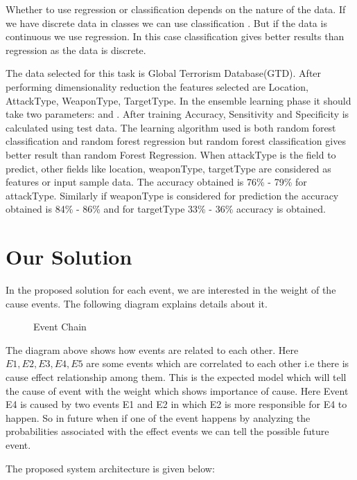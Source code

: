 \documentclass[journal,onecolumn,11pt]{IEEEtran}
\begin{document}
Whether to use regression or classification depends on the nature of the data. If we have discrete data in classes we can use classification . But if the data is continuous we use regression. In this case classification gives better results than regression as the data is discrete.

The data selected for this task is Global Terrorism Database(GTD). After performing dimensionality reduction the features selected are Location, AttackType, WeaponType, TargetType. In the ensemble learning phase it should take two parameters:  and . After training Accuracy, Sensitivity and Specificity is calculated using test data.
The learning algorithm used is both random forest classification and random forest regression but random forest classification gives better result than random Forest Regression. 
When attackType is the field to predict, other fields like location, weaponType, targetType are considered as features or input sample data.  The accuracy obtained is 76\% - 79\% for attackType. Similarly if weaponType is considered for prediction  the accuracy obtained is 84\% - 86\% and for targetType 33\% - 36\% accuracy is obtained.

\section{Our Solution}
In the proposed solution for each event, we are interested in the weight of the cause events. The following diagram explains details about it.


\label{solution}
\begin{figure}[h!]
    \centering
    \def\svgwidth{0.35 \columnwidth}
    
    
    \caption{Event Chain}
\end{figure}

The diagram above shows how events are related to each other. Here $E1, E2, E3, E4, E5$ are some events which are correlated to each other i.e there is cause effect relationship among them. This is the expected model which will tell the cause of event with the weight which shows importance of cause. Here Event E4 is caused by two events E1 and E2 in which E2 is more responsible for E4 to happen. So in future when if one of the event happens by analyzing the probabilities associated with the effect events we can tell the possible future event.

The proposed system architecture is given below:
\end{document}
